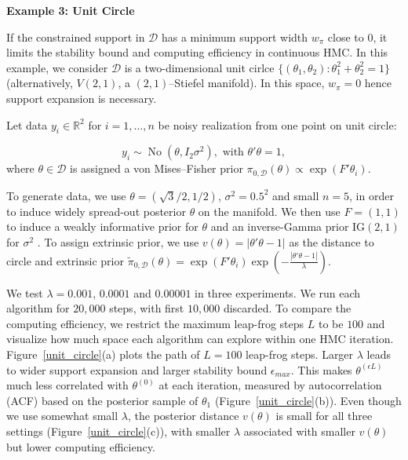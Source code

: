 \documentclass[10pt]{article}
\newcommand{\mc}[1]{\mathcal{#1}}
\DeclareMathOperator{\No}{No}
\DeclareMathOperator{\1}{\mathbbm{1}}
\begin{document}
{\bf Example 3: Unit Circle}

If the constrained support in $\mc D$ has a minimum support width $w_\pi$ close to $0$, it limits the stability bound and computing efficiency in continuous HMC. In this example, we consider $\mc D$ is a two-dimensional unit cirlce $\{(\theta_1,\theta_2):\theta_1^2+\theta_2^2=1\}$ (alternatively, $V(2,1)$, a $(2,1)$--Stiefel manifold). In this space, $w_\pi =0$ hence support expansion is necessary.

Let data $y_i\in \mathbb{R}^2$ for $i=1,\ldots,n$  be noisy realization from one point on unit circle:

$$y_i\sim \No(\theta, I_2\sigma^2),\text{ with } \theta'\theta=1,$$
where $\theta \in \mc D$ is assigned a von Mises--Fisher prior $\pi_{0,\mc D}(\theta) \propto \exp(F'\theta_i)$.

 To generate data, we use $\theta= (\sqrt 3/2, 1/2)$, $\sigma^2=0.5^2$ and small $n=5$, in order to induce widely spread-out posterior $\theta$ on the manifold. We then use $F=(1,1)$ to induce a weakly informative prior for $\theta$ and an inverse-Gamma prior $\text{IG}(2,1)$ for $\sigma^2$ . To assign extrinsic prior, we use $v(\theta)=|\theta'\theta -1|$ as the distance to circle and extrinsic prior $\tilde\pi_{0,\mc D}(\theta)= \exp(F'\theta_i) \exp(-\frac{|\theta'\theta -1|}{\lambda})$.

We test $\lambda = 0.001$, $0.0001$ and $0.00001$ in three experiments. We run each algorithm for $20,000$ steps, with first $10,000$ discarded. To compare the computing efficiency, we restrict the maximum leap-frog steps $L$ to be $100$ and visualize how much space each algorithm can explore within one HMC iteration. Figure~\ref{unit_circle}(a) plots the path of $L=100$ leap-frog steps. Larger $\lambda$ leads to wider support expansion and larger stability bound $\epsilon_{max}$. This makes $\theta^{(\epsilon L)}$  much less correlated with $\theta^{(0)}$ at each iteration, measured by autocorrelation (ACF) based on the posterior sample of $\theta_1$ (Figure~\ref{unit_circle}(b)). Even though we use somewhat small $\lambda$, the posterior distance $v(\theta)$ is small for all three settings (Figure~\ref{unit_circle}(c)), with smaller $\lambda$ associated with smaller $v(\theta)$ but lower computing efficiency.
\end{document}
